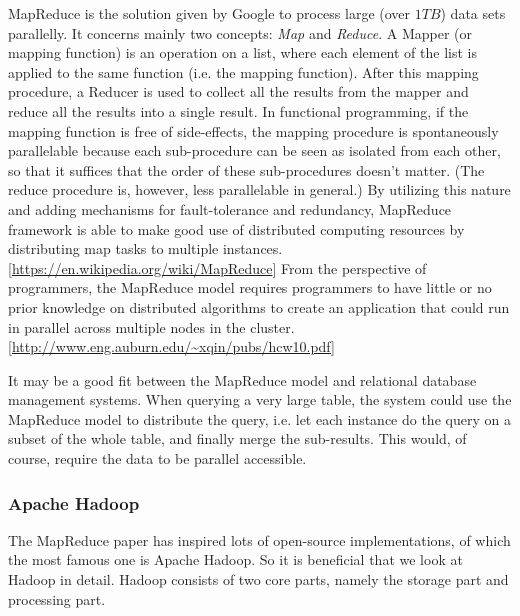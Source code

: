 \documentclass{article}
\begin{document}
MapReduce is the solution given by Google to process large (over $1TB$) data sets parallelly. It concerns mainly two concepts: \textit{Map} and \textit{Reduce}. A Mapper (or mapping function) is an operation on a list, where each element of the list is applied to the same function (i.e. the mapping function). After this mapping procedure, a Reducer is used to collect all the results from the mapper and reduce all the results into a single result. In functional programming, if the mapping function is free of side-effects, the mapping procedure is spontaneously parallelable because each sub-procedure can be seen as isolated from each other, so that it suffices that the order of these sub-procedures doesn't matter. (The reduce procedure is, however, less parallelable in general.) By utilizing this nature and adding mechanisms for fault-tolerance and redundancy, MapReduce framework is able to make good use of distributed computing resources by distributing map tasks to multiple instances.[\url{https://en.wikipedia.org/wiki/MapReduce}] From the perspective of programmers, the MapReduce model requires programmers to have little or no prior knowledge on distributed algorithms to create an application that could run in parallel across multiple nodes in the cluster.[\url{http://www.eng.auburn.edu/~xqin/pubs/hcw10.pdf}]

It may be a good fit between the MapReduce model and relational database management systems. When querying a very large table, the system could use the MapReduce model to distribute the query, i.e. let each instance do the query on a subset of the whole table, and finally merge the sub-results. This would, of course, require the data to be parallel accessible.

\subsubsection{Apache Hadoop}

The MapReduce paper has inspired lots of open-source implementations, of which the most famous one is Apache Hadoop. So it is beneficial that we look at Hadoop in detail. Hadoop consists of two core parts, namely the storage part and processing part.
\end{document}
